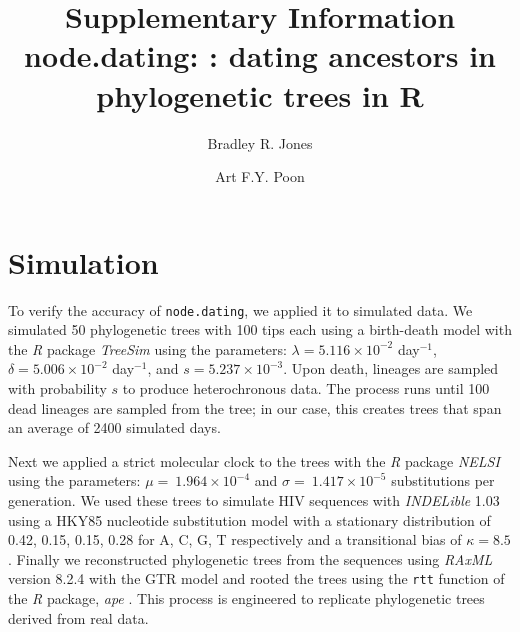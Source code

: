 \documentclass{article}
\newcommand{\code}[1]{{\tt #1}}
\newcommand{\edit}[1]{#1}
\begin{document}
\title{Supplementary Information \\ node.dating: : dating ancestors in phylogenetic trees in R}

\author[1,2,*]{Bradley R. Jones}
\author[2,3]{Art F.Y. Poon}

\date{}

\maketitle

\section{Simulation} \label{sec:sim}
To verify the accuracy of \code{node.dating}, we applied it to simulated data.
We simulated 50 phylogenetic trees with 100 tips each using a birth-death model with the \emph{R} package \emph{TreeSim} \citep{TreeSim} using the parameters: $\lambda = 5.116 \times 10^{-2}$ day$^{-1}$, $\delta = 5.006 \times 10^{-2}$ day$^{-1}$, and $s = 5.237 \times 10^{-3}$.
\edit{Upon death, lineages are sampled with probability $s$ to produce heterochronous data.
The process runs until 100 dead lineages are sampled from the tree; in our case, this creates trees that span an average of 2400 simulated days.}

\edit{Next we} applied a strict molecular clock to the trees with the \emph{R} package \emph{NELSI} \citep{NELSI} using the parameters: $\mu = \ 1.964\times 10^{-4}$ and $\sigma = \ 1.417\times 10^{-5}$ substitutions per generation.
We used these trees to simulate HIV sequences with \emph{INDELible} 1.03 \citep{Indelible09} using a HKY85 nucleotide substitution model \cite{HKY85} with a stationary distribution of 0.42, 0.15, 0.15, 0.28 for A, C, G, T respectively and a transitional bias of $\kappa = 8.5$.
Finally we reconstructed phylogenetic trees from the sequences using \emph{RAxML} version 8.2.4 \citep{Raxml14} with the GTR model and rooted the trees using the \code{rtt} function of the \emph{R} package, \emph{ape} \citep{APE}.
This process is engineered to replicate phylogenetic trees derived from real data.
\end{document}
